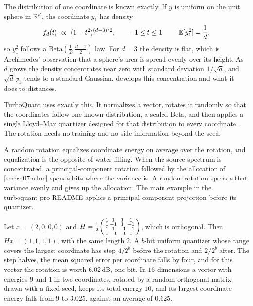 The distribution of one coordinate is known exactly. If $y$ is uniform on the unit sphere in $\mathbb{R}^d$, the coordinate $y_1$ has density
\begin{equation}\label{eq:ch07:beta}
f_d(t)\ \propto\ (1-t^2)^{(d-3)/2},\qquad -1\le t\le1,\qquad \mathbb{E}[y_1^2]=\frac1d ,
\end{equation}
so $y_1^2$ follows a $\mathrm{Beta}(\tfrac12,\tfrac{d-1}2)$ law. For $d=3$ the density is flat, which is Archimedes' observation that a sphere's area is spread evenly over its height. As $d$ grows the density concentrates near zero with standard deviation $1/\sqrt d$, and $\sqrt d\,y_1$ tends to a standard Gaussian.  develops this concentration and what it does to distances.

TurboQuant uses exactly this. It normalizes a vector, rotates it randomly so that the coordinates follow one known distribution, a scaled Beta, and then applies a single Lloyd--Max quantizer designed for that distribution to every coordinate \cite{zandieh2025turboquant}. The rotation needs no training and no side information beyond the seed.

A random rotation equalizes coordinate energy on average over the rotation, and equalization is the opposite of water-filling. When the source spectrum is concentrated, a principal-component rotation followed by the allocation of \cref{sec:ch07:alloc} spends bits where the variance is. A random rotation spreads that variance evenly and gives up the allocation. The main example in the turboquant-pro README applies a principal-component projection before its quantizer.

\begin{example}\label{ex:ch07:rotation}
Let $x=(2,0,0,0)$ and $H=\frac12\begin{psmallmatrix}1&1&1&1\\1&-1&1&-1\\1&1&-1&-1\\1&-1&-1&1\end{psmallmatrix}$, which is orthogonal. Then $Hx=(1,1,1,1)$, with the same length $2$. A $b$-bit uniform quantizer whose range covers the largest coordinate has step $4/2^b$ before the rotation and $2/2^b$ after. The step halves, the mean squared error per coordinate falls by four, and for this vector the rotation is worth $6.02$\,dB, one bit. In $16$ dimensions a vector with energies $9$ and $1$ in two coordinates, rotated by a random orthogonal matrix drawn with a fixed seed, keeps its total energy $10$, and its largest coordinate energy falls from $9$ to $3.025$, against an average of $0.625$.
\end{example}

